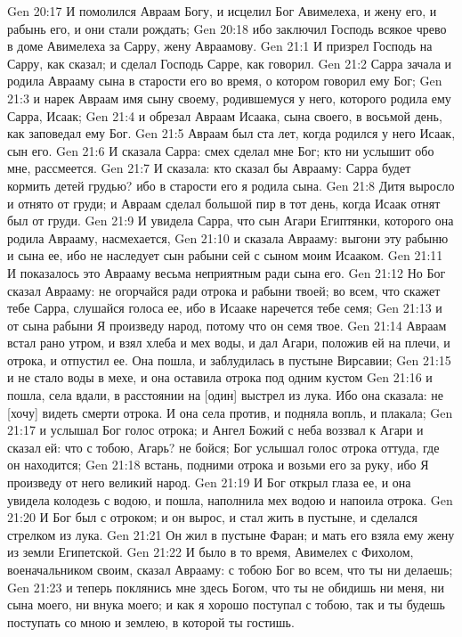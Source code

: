 Gen 20:17  И помолился Авраам Богу, и исцелил Бог Авимелеха, и жену его, и рабынь его, и они стали рождать;
Gen 20:18  ибо заключил Господь всякое чрево в доме Авимелеха за Сарру, жену Авраамову.
Gen 21:1  И призрел Господь на Сарру, как сказал; и сделал Господь Сарре, как говорил.
Gen 21:2  Сарра зачала и родила Аврааму сына в старости его во время, о котором говорил ему Бог;
Gen 21:3  и нарек Авраам имя сыну своему, родившемуся у него, которого родила ему Сарра, Исаак;
Gen 21:4  и обрезал Авраам Исаака, сына своего, в восьмой день, как заповедал ему Бог.
Gen 21:5  Авраам был ста лет, когда родился у него Исаак, сын его.
Gen 21:6  И сказала Сарра: смех сделал мне Бог; кто ни услышит обо мне, рассмеется.
Gen 21:7  И сказала: кто сказал бы Аврааму: Сарра будет кормить детей грудью? ибо в старости его я родила сына.
Gen 21:8  Дитя выросло и отнято от груди; и Авраам сделал большой пир в тот день, когда Исаак отнят был от груди.
Gen 21:9  И увидела Сарра, что сын Агари Египтянки, которого она родила Аврааму, насмехается,
Gen 21:10  и сказала Аврааму: выгони эту рабыню и сына ее, ибо не наследует сын рабыни сей с сыном моим Исааком.
Gen 21:11  И показалось это Аврааму весьма неприятным ради сына его.
Gen 21:12  Но Бог сказал Аврааму: не огорчайся ради отрока и рабыни твоей; во всем, что скажет тебе Сарра, слушайся голоса ее, ибо в Исааке наречется тебе семя;
Gen 21:13  и от сына рабыни Я произведу народ, потому что он семя твое.
Gen 21:14  Авраам встал рано утром, и взял хлеба и мех воды, и дал Агари, положив ей на плечи, и отрока, и отпустил ее. Она пошла, и заблудилась в пустыне Вирсавии;
Gen 21:15  и не стало воды в мехе, и она оставила отрока под одним кустом
Gen 21:16  и пошла, села вдали, в расстоянии на [один] выстрел из лука. Ибо она сказала: не [хочу] видеть смерти отрока. И она села против, и подняла вопль, и плакала;
Gen 21:17  и услышал Бог голос отрока; и Ангел Божий с неба воззвал к Агари и сказал ей: что с тобою, Агарь? не бойся; Бог услышал голос отрока оттуда, где он находится;
Gen 21:18  встань, подними отрока и возьми его за руку, ибо Я произведу от него великий народ.
Gen 21:19  И Бог открыл глаза ее, и она увидела колодезь с водою, и пошла, наполнила мех водою и напоила отрока.
Gen 21:20  И Бог был с отроком; и он вырос, и стал жить в пустыне, и сделался стрелком из лука.
Gen 21:21  Он жил в пустыне Фаран; и мать его взяла ему жену из земли Египетской.
Gen 21:22  И было в то время, Авимелех с Фихолом, военачальником своим, сказал Аврааму: с тобою Бог во всем, что ты ни делаешь;
Gen 21:23  и теперь поклянись мне здесь Богом, что ты не обидишь ни меня, ни сына моего, ни внука моего; и как я хорошо поступал с тобою, так и ты будешь поступать со мною и землею, в которой ты гостишь.
